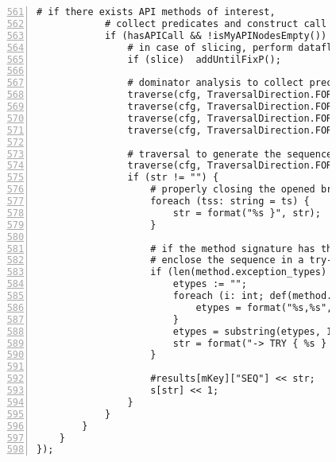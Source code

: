 \begin{figure}[ht!]
\begin{lstlisting}[numbers=left, tabsize=4, escapechar=@, caption={API Usage Mining Analysis},label={lst:aun-code},  firstline = 561, firstnumber = 561, lastline = 621]
            # if there exists API methods of interest, 
            # collect predicates and construct call sequences
		    if (hasAPICall && !isMyAPINodesEmpty()) {
		        # in case of slicing, perform dataflow slicing to capture dependencies
		        if (slice)  addUntilFixP();
		        
		        # dominator analysis to collect preconditions
		        traverse(cfg, TraversalDirection.FORWARD, TraversalKind.SHALLOW_ITERATIVE, allnode_ids);
			    traverse(cfg, TraversalDirection.FORWARD, TraversalKind.HYBRID, cfg_dom, fixp_dom);
			    traverse(cfg, TraversalDirection.FORWARD, TraversalKind.SHALLOW_ITERATIVE, dom_result);
			    traverse(cfg, TraversalDirection.FORWARD, TraversalKind.SHALLOW_ITERATIVE, dom_more);
                
                # traversal to generate the sequence
		        traverse(cfg, TraversalDirection.FORWARD, TraversalKind.SHALLOW_ITERATIVE, seqGen);
    			if (str != "") {
    			    # properly closing the opened braces in the sequence
    				foreach (tss: string = ts) {
    					str = format("%s }", str);
    				}
    				
    				# if the method signature has throws exceptions,
    				# enclose the sequence in a try-catch
    				if (len(method.exception_types) > 0) {
    				    etypes := "";
    				    foreach (i: int; def(method.exception_types[i])) {
    				        etypes = format("%s,%s", etypes, method.exception_types[i].name);
    				    }
    				    etypes = substring(etypes, 1);
    				    str = format("-> TRY { %s } CATCH(%s) {}", str, etypes);
    				}
    				    
    				#results[mKey]["SEQ"] << str; 
    				s[str] << 1; 
    			}
		    }
		}
	}
});
\end{lstlisting}
\end{figure}